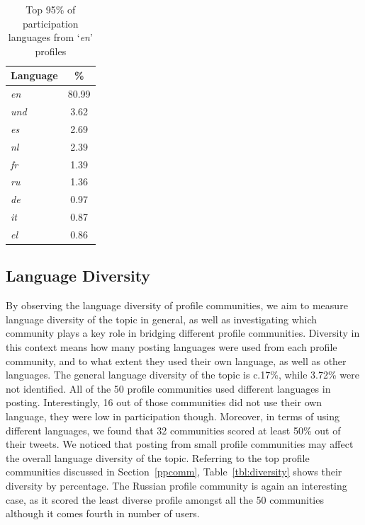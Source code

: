 \begin{table}[!htb]
\centering
\begin{tabular}{@{}lc}
\toprule
\textbf{Language} & \textbf{\%} \\ 
\midrule
{\emph{en}} & 80.99 \\
{\emph{und}} & 3.62 \\
{\emph{es}} & 2.69 \\
{\emph{nl}} & 2.39 \\
{\emph{fr}} & 1.39 \\
{\emph{ru}} & 1.36 \\
{\emph{de}} & 0.97 \\
{\emph{it}} & 0.87 \\ 
{\emph{el}} & 0.86 \\ 
\bottomrule
\end{tabular}
\caption{Top 95\% of participation languages from `{\emph{en}}' profiles}
\label{tbl:enpartlangs}
\end{table}


\subsection{Language Diversity}

By observing the language diversity of profile communities, we aim to
measure language diversity of the topic in general, as well as
investigating which community plays a key role in bridging different
profile communities. Diversity in this context means how many posting
languages were used from each profile community, and to what extent
they used their own language, as well as other languages.  The general
language diversity of the topic is c.17\%, while 3.72\% were not
identified. All of the 50 profile communities used different languages
in posting. Interestingly, 16 out of those communities did not use
their own language, they were low in participation though. Moreover,
in terms of using different languages, we found that 32 communities
scored at least 50\% out of their tweets. We noticed that posting from
small profile communities may affect the overall language diversity of
the topic. Referring to the top profile communities discussed in
Section~\ref{ppcomm}, Table~\ref{tbl:diversity} shows their
diversity by percentage. The Russian profile community is again an
interesting case, as it scored the least diverse profile amongst all
the 50 communities although it comes fourth in number of users.


